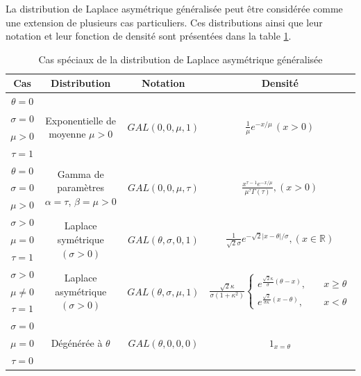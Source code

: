 La distribution de Laplace asymétrique généralisée peut être
considérée comme une extension de plusieurs cas particuliers. Ces
distributions ainsi que leur notation et leur fonction de densité sont
présentées dans la table \ref{tab:casspeciauxGAL}.
\begin{table}[!ht]
  \centering
  \begin{tabular}{cccc}
    \hline
    \textbf{Cas} & \textbf{Distribution} & \textbf{Notation} & \textbf{Densité} \\
    \hline
    $\theta=0$ & \multirow{4}{*}{Exponentielle de moyenne $\mu>0$} & \multirow{4}{*}{$GAL(0,0,\mu,1)$} & \multirow{4}{*}{$\frac{1}{\mu}e^{-x/\mu}\,(x > 0)$} \\ 
    $\sigma=0$ &  &  &  \\
    $\mu>0$ &  &  &  \\ 
    $\tau=1$ &  &  &  \\ \hline
    $\theta=0$ & \multirow{3}{*}{Gamma de paramètres $\alpha=\tau$, $\beta=\mu>0$} &
    \multirow{3}{*}{$GAL(0,0,\mu,\tau)$} & \multirow{3}{*}{$\frac{x^{\tau-1}e^{-x/\mu}}{\mu^\tau\Gamma(\tau)},(x > 0)$} \\
    $\sigma=0$ &  &  &  \\
    $\mu>0$ &  &  &  \\ \hline
    $\sigma>0$ & \multirow{3}{*}{Laplace symétrique $(\sigma>0)$} &
    \multirow{3}{*}{$GAL(\theta,\sigma,0,1)$} & \multirow{3}{*}{$\frac{1}{\sqrt{2}\sigma}e^{-\sqrt{2}|x-\theta|/\sigma},(x \in \mathbb{R})$} \\
    $\mu=0$ &  &  &  \\
    $\tau=1$ &  &  &  \\ \hline
    $\sigma>0$ & \multirow{3}{*}{Laplace asymétrique $(\sigma>0)$} &
    \multirow{3}{*}{$GAL(\theta,\sigma,\mu,1)$} & \multirow{3}{*}{$\frac{\sqrt{2}\kappa}{\sigma(1+\kappa^2)}\begin{cases}e^{\frac{\sqrt{2}\kappa}{\sigma}(\theta-x)},\quad & x\geq\theta \\ e^{\frac{\sqrt{2}}{\sigma\kappa}(x-\theta)},\quad & x < \theta \end{cases}$} \\
    $\mu \neq 0$ &  &  &  \\
    $\tau=1$ &  &  &  \\ \hline
    $\sigma=0$ & \multirow{3}{*}{Dégénérée à $\theta$} & \multirow{3}{*}{$GAL(\theta,0,0,0)$} & \multirow{3}{*}{$1_{x=\theta}$} \\
    $\mu=0$ &  &  &  \\ 
    $\tau=0$ &  &  &  \\ \hline
  \end{tabular}
  \caption{Cas spéciaux de la distribution de Laplace asymétrique généralisée}
  \label{tab:casspeciauxGAL}
\end{table}

